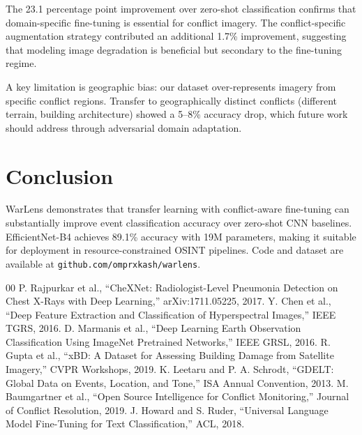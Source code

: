 \documentclass[conference]{IEEEtran}
\begin{document}
The 23.1 percentage point improvement over zero-shot classification confirms that domain-specific fine-tuning is essential for conflict imagery. The conflict-specific augmentation strategy contributed an additional 1.7\% improvement, suggesting that modeling image degradation is beneficial but secondary to the fine-tuning regime.

A key limitation is geographic bias: our dataset over-represents imagery from specific conflict regions. Transfer to geographically distinct conflicts (different terrain, building architecture) showed a 5--8\% accuracy drop, which future work should address through adversarial domain adaptation.

\section{Conclusion}

WarLens demonstrates that transfer learning with conflict-aware fine-tuning can substantially improve event classification accuracy over zero-shot CNN baselines. EfficientNet-B4 achieves 89.1\% accuracy with 19M parameters, making it suitable for deployment in resource-constrained OSINT pipelines. Code and dataset are available at \texttt{github.com/omprxkash/warlens}.

\begin{thebibliography}{00}
 P. Rajpurkar et al., ``CheXNet: Radiologist-Level Pneumonia Detection on Chest X-Rays with Deep Learning,'' arXiv:1711.05225, 2017.
 Y. Chen et al., ``Deep Feature Extraction and Classification of Hyperspectral Images,'' IEEE TGRS, 2016.
 D. Marmanis et al., ``Deep Learning Earth Observation Classification Using ImageNet Pretrained Networks,'' IEEE GRSL, 2016.
 R. Gupta et al., ``xBD: A Dataset for Assessing Building Damage from Satellite Imagery,'' CVPR Workshops, 2019.
 K. Leetaru and P. A. Schrodt, ``GDELT: Global Data on Events, Location, and Tone,'' ISA Annual Convention, 2013.
 M. Baumgartner et al., ``Open Source Intelligence for Conflict Monitoring,'' Journal of Conflict Resolution, 2019.
 J. Howard and S. Ruder, ``Universal Language Model Fine-Tuning for Text Classification,'' ACL, 2018.
\end{thebibliography}
\end{document}
